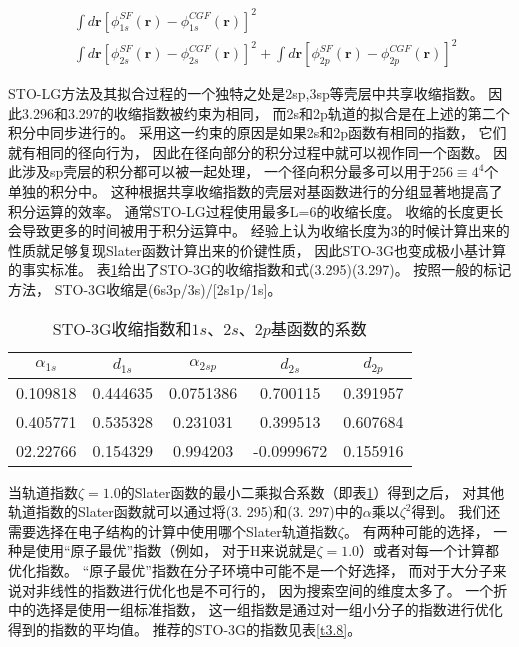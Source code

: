 \begin{align*}
	&\int d\mathbf{r}[\phi_{1s}^{SF}(\mathbf{r})-\phi_{1s}^{CGF}(\mathbf{r})]^2\\
	&\int d\mathbf{r}[\phi_{2s}^{SF}(\mathbf{r})-\phi_{2s}^{CGF}(\mathbf{r})]^2+	\int d\mathbf{r}[\phi_{2p}^{SF}(\mathbf{r})-\phi_{2p}^{CGF}(\mathbf{r})]^2	
\end{align*}

STO-LG方法及其拟合过程的一个独特之处是2sp,3sp等壳层中共享收缩指数。
因此3.296和3.297的收缩指数被约束为相同，
而2s和2p轨道的拟合是在上述的第二个积分中同步进行的。
采用这一约束的原因是如果2s和2p函数有相同的指数，
它们就有相同的径向行为，
因此在径向部分的积分过程中就可以视作同一个函数。
因此涉及sp壳层的积分都可以被一起处理，
一个径向积分最多可以用于$256\equiv4^4$个单独的积分中。
这种根据共享收缩指数的壳层对基函数进行的分组显著地提高了积分运算的效率。
通常STO-LG过程使用最多L=6的收缩长度。
收缩的长度更长会导致更多的时间被用于积分运算中。
经验上认为收缩长度为3的时候计算出来的性质就足够复现Slater函数计算出来的价键性质，
因此STO-3G也变成极小基计算的事实标准。
表\ref{t3.7}给出了STO-3G的收缩指数和式(3.295)(3.297)。
按照一般的标记方法，
STO-3G收缩是(6s3p/3s)/[2s1p/1s]。
\begin{table}[h]
	\centering\caption{STO-3G收缩指数和$1s$、$2s$、$2p$基函数的系数}
	\begin{tabular}{ccccc}
		\hline
		$\alpha_{1s}$&$d_{1s}$&$\alpha_{2sp}$&$d_{2s}$&$d_{2p}$\\\hline
		0.109818	 &0.444635&0.0751386	 &0.700115&0.391957\\
		0.405771	 &0.535328&0.231031	 &0.399513&0.607684\\
		02.22766	 &0.154329&0.994203	 &-0.0999672&0.155916\\
		\hline
	\end{tabular}
	\label{t3.7}
\end{table}
当轨道指数$\zeta = 1.0$的Slater函数的最小二乘拟合系数（即表\ref{t3.7}）得到之后，
对其他轨道指数的Slater函数就可以通过将(3.
295)和(3.
297)中的$\alpha$乘以$\zeta^2$得到。
我们还需要选择在电子结构的计算中使用哪个Slater轨道指数$\zeta$。
有两种可能的选择，
一种是使用“原子最优”指数（例如，
对于H来说就是$\zeta=1.0$）或者对每一个计算都优化指数。
“原子最优”指数在分子环境中可能不是一个好选择，
而对于大分子来说对非线性的指数进行优化也是不可行的，
因为搜索空间的维度太多了。
一个折中的选择是使用一组标准指数，
这一组指数是通过对一组小分子的指数进行优化得到的指数的平均值。
推荐的STO-3G的指数见表\ref{t3.8}。

